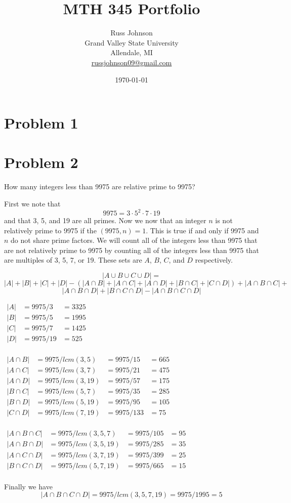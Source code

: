 \documentclass[11pt,openany]{book}
\title{{\bf MTH 345 Portfolio}}
\author{Russ Johnson\\
Grand Valley State University\\
Allendale, MI\\
\url{russjohnson09@gmail.com}\\
}
\date{\today}
\begin{document}
\chapter{Problem 1}



\chapter{Problem 2}

How many integers less than 9975 are relative prime to 9975?

First we note that
\[9975 = 3\cdot 5^2 \cdot 7 \cdot 19\]
and that 3, 5, and 19 are all primes. Now we now that an integer $n$ is not relatively prime to 9975 if the $(9975,n)=1$. This is true if and only if 9975 and $n$ do not share prime factors. We will count all of the integers less than 9975 that are not relatively prime to 9975 by counting all of the integers less than 9975 that are multiples of 3, 5, 7, or 19. These sets are $A$, $B$, $C$, and $D$ respectively.


\[|A\cup B \cup C\cup D|=\]
\[|A| + |B| + |C| + |D| - (|A\cap B|+|A\cap C|+|A\cap D|+|B\cap C|+|C\cap D|)+|A\cap B\cap C|+\]
\[|A\cap B\cap D|+|B\cap C\cap D| -|A\cap B\cap C\cap D|\]
\begin{center}
$
\begin{array}{rll}
|A| &= 9975/3&=3325\\
|B| &= 9975/5&=1995\\
|C| &= 9975/7&=1425\\
|D| &= 9975/19&=525\\
\end{array}
$
\end{center}


\begin{center}
$
\begin{array}{rlll}
|A\cap B| &= 9975/lcm(3,5)&=9975/15&=665\\
|A\cap C| &= 9975/lcm(3,7)&=9975/21&=475\\
|A\cap D| &= 9975/lcm(3,19)&=9975/57&=175\\
|B\cap C| &= 9975/lcm(5,7)&=9975/35&=285\\
|B\cap D| &= 9975/lcm(5,19)&=9975/95&=105\\
|C\cap D| &= 9975/lcm(7,19)&=9975/133&=75\\
\end{array}
$
\end{center}

\begin{center}
$
\begin{array}{rlll}
|A\cap B\cap C| &= 9975/lcm(3,5,7)&=9975/105&=95\\
|A\cap B\cap D| &= 9975/lcm(3,5,19)&=9975/285&=35\\
|A\cap C\cap D| &= 9975/lcm(3,7,19)&=9975/399&=25\\
|B\cap C\cap D| &= 9975/lcm(5,7,19)&=9975/665&=15\\
\end{array}
$
\end{center}
Finally we have
\[|A\cap B\cap C\cap D| = 9975/lcm(3,5,7, 19)=9975/1995=5\]
\end{document}

